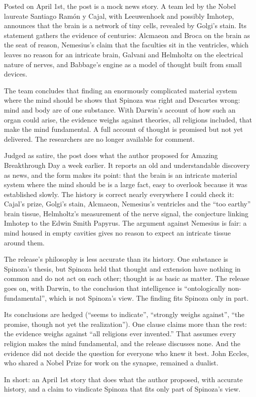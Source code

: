 \begin{afterword}
\summaryhead

Posted on April 1st, the post is a mock news story. A team led by the Nobel laureate Santiago Ram\'on y Cajal, with Leeuwenhoek and possibly Imhotep, announces that the brain is a network of tiny cells, revealed by Golgi's stain. Its statement gathers the evidence of centuries: Alcmaeon and Broca on the brain as the seat of reason, Nemesius's claim that the faculties sit in the ventricles, which leaves no reason for an intricate brain, Galvani and Helmholtz on the electrical nature of nerves, and Babbage's engine as a model of thought built from small devices.

The team concludes that finding an enormously complicated material system where the mind should be shows that Spinoza was right and Descartes wrong: mind and body are of one substance. With Darwin's account of how such an organ could arise, the evidence weighs against theories, all religions included, that make the mind fundamental. A full account of thought is promised but not yet delivered. The researchers are no longer available for comment.

\responsehead

Judged as satire, the post does what the author proposed for Amazing Breakthrough Day a week earlier. It reports an old and understandable discovery as news, and the form makes its point: that the brain is an intricate material system where the mind should be is a large fact, easy to overlook because it was established slowly. The history is correct nearly everywhere I could check it: Cajal's prize, Golgi's stain, Alcmaeon, Nemesius's ventricles and the ``too earthy'' brain tissue, Helmholtz's measurement of the nerve signal, the conjecture linking Imhotep to the Edwin Smith Papyrus. The argument against Nemesius is fair: a mind housed in empty cavities gives no reason to expect an intricate tissue around them.

The release's philosophy is less accurate than its history. One substance is Spinoza's thesis, but Spinoza held that thought and extension have nothing in common and do not act on each other; thought is as basic as matter. The release goes on, with Darwin, to the conclusion that intelligence is ``ontologically non-fundamental'', which is not Spinoza's view. The finding fits Spinoza only in part.

Its conclusions are hedged (``seems to indicate'', ``strongly weighs against'', ``the promise, though not yet the realization''). One clause claims more than the rest: the evidence weighs against ``all religions ever invented.'' That assumes every religion makes the mind fundamental, and the release discusses none. And the evidence did not decide the question for everyone who knew it best. John Eccles, who shared a Nobel Prize for work on the synapse, remained a dualist.

In short: an April 1st story that does what the author proposed, with accurate history, and a claim to vindicate Spinoza that fits only part of Spinoza's view.
\end{afterword}
